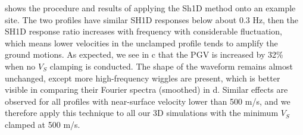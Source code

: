  shows the procedure and results of applying the Sh1D method onto an example site. The two profiles have similar SH1D responses below about 0.3 Hz, then the SH1D response ratio increases with frequency with considerable fluctuation, which means lower velocities in the unclamped profile tends to amplify the ground motions. As expected, we see in c that the PGV is increased by 32\% when no $V_S$ clamping is conducted. The shape of the waveform remains almost unchanged, except more high-frequency wiggles are present, which is better visible in comparing their Fourier spectra (smoothed) in d. Similar effects are observed for all profiles with near-surface velocity lower than 500 m/s, and we therefore apply this technique to all our 3D simulations with the minimum $V_S$ clamped at 500 m/s. 



